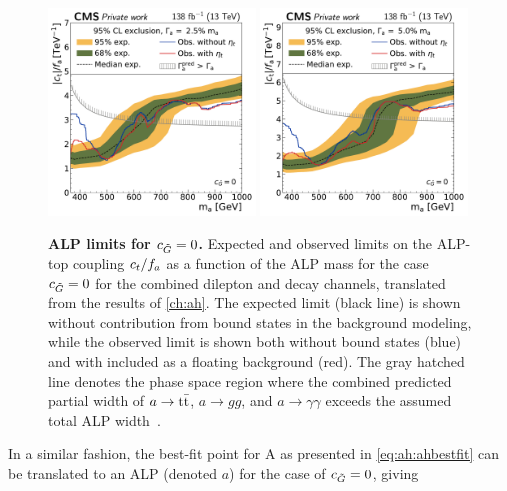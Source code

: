 \begin{figure}[t]
    \centering
    \includegraphics[width=0.49\textwidth]{figures/alps/A_limit_w2p5_g-scan_alp_lx.pdf}
    \hfill
    \includegraphics[width=0.49\textwidth]{figures/alps/A_limit_w5p0_g-scan_alp_lx.pdf}
    \caption{
        \textbf{ALP limits for $c_{\tilde{G}} = 0$.} Expected and observed limits on the ALP-top coupling $c_t / f_a$ as a function of the ALP mass for the case $c_{\tilde{G}} = 0$ for the combined dilepton and \ljets decay channels, translated from the results of \cref{ch:ah}. The expected limit (black line) is shown without contribution from \ttbar bound states in the background modeling, while the observed limit is shown both without \ttbar bound states (blue) and with \etat included as a floating background (red). The gray hatched line denotes the phase space region where the combined predicted partial width of $a \rightarrow \mathrm{t \bar{t}}$, $a \rightarrow gg$, and $a \rightarrow \gamma\gamma$ exceeds the assumed total ALP width~\cite{Jeppe:2024sxt}.
    }
    \label{fig:alps:translation}
\end{figure}

In a similar fashion, the best-fit point for A as presented in \cref{eq:ah:ahbestfit} can be translated to an ALP (denoted $a$) for the case of $c_{\tilde{G}} = 0$, giving

